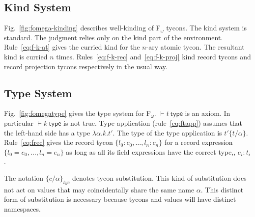 \documentclass[9pt,nocopyrightspace, fleqn]{sigplanconf}
\begin{document}
\subsection{Kind System}
Fig.~\ref{fig:fomega-kinding} describes well-kinding of F$_\omega$
tycons. The kind system is standard. The judgment relies only on the
kind part of the environment. Rule~\ref{eq:f-k-at} gives the curried
kind for the $n$-ary atomic tycon. The resultant kind is curried $n$
times.  Rules~\ref{eq:f-k-rec}
and~\ref{eq:f-k-proj} kind record tycons and record projection tycons
respectively in the usual way. 

\subsection{Type System}
Fig.~\ref{fig:fomegatype} gives the type system for
F$_\omega$. $\vdash t~\mathsf{type}$ is an axiom. In particular
$\vdash k~\mathsf{type}$ is not true. Type application
(rule~\ref{eq:ftapp}) assumes that the left-hand side has a type
$\lambda\alpha.k.t'$. The type of the type application is
$t'\{t/\alpha\}$. Rule~\ref{eq:frec} gives the record tycon
$\{l_0:c_0,\ldots,l_n:c_n\}$ for a
record expression $\{l_0=e_0, \ldots, l_n=e_n\}$ as long as all its
field expressions have the correct type,\ie, $e_i : t_i$. 

The notation $\{c/\alpha\}_{tyc}$ denotes tycon substitution. This
kind of substitution does not act on values that may coincidentally
share the same name $\alpha$. This distinct form of substitution is
necessary because tycons and values will have distinct namespaces. 
      

% 
 
 
 
 
 
 
\end{document}
